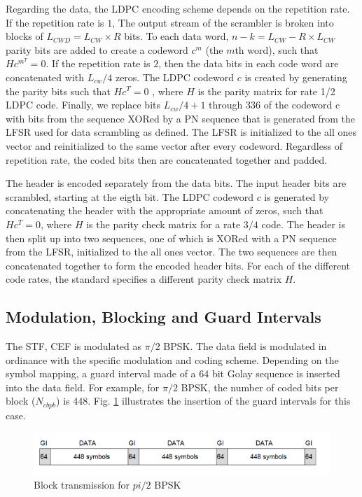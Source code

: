 \documentclass[conference]{IEEEtran}
\begin{document}
Regarding the data, the LDPC encoding scheme depends on the repetition rate. If the repetition rate is $1$, The output stream of the scrambler is broken into blocks of $L_{CWD} = L_{CW} \times R$ bits. To each data word, $n-k=L_{CW} - R \times L_{CW}$ parity bits are added to create a codeword $c^{m}$ (the $m$th word), such that $Hc^{m^{T}} = 0$. If the repetition rate is $2$, then the data bits in each code word are concatenated with $L_{cw}/4$ zeros. The LDPC codeword $c$ is created by generating the parity bits  such that $Hc^T = 0$ , where $H$ is the parity matrix
for rate 1/2 LDPC code. Finally, we replace bits $L_{cw}/4 + 1$ through 336 of the codeword c with bits from the sequence XORed by a PN sequence that is generated from the LFSR used for data
scrambling as defined. The LFSR is initialized to the all ones vector and reinitialized to the same vector after every codeword. Regardless of repetition rate, the coded bits then are concatenated together and padded. 

The header is encoded separately from the data bits. The input header bits are scrambled, starting at the eigth bit. The LDPC codeword $c$ is generated by concatenating the header with the appropriate amount of zeros, such that $Hc^T = 0$, where $H$ is the parity check matrix for a rate $3/4$ code. The header is then split up into two sequences, one of which is XORed with a PN sequence from the LFSR, initialized to the all ones vector. The two sequences are then concatenated together to form the encoded header bits. For each of the different code rates, the standard specifies a different parity check matrix $H$.

\subsection{Modulation, Blocking and Guard Intervals} 
The STF, CEF is modulated as $\pi/2$ BPSK. The data field is modulated in ordinance with the specific modulation and coding scheme. Depending on the symbol mapping, a guard interval made of a 64 bit Golay sequence is inserted into the data field. For example, for $\pi/2$ BPSK, the number of coded bits per block ($N_{cbpb}$) is 448. Fig. \ref{data} illustrates the insertion of the guard intervals for this case. 
\begin{figure}[htbp]
\centerline{\includegraphics[scale=.4]{./media/data.png}}
\caption{Block transmission for $pi/2$ BPSK}
\label{data}
\end{figure} 
\end{document}
